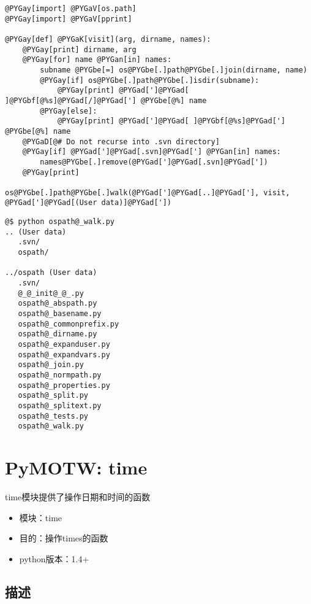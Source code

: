 \documentclass[a4paper,10pt,english]{manual}
\begin{document}
\begin{Verbatim}[commandchars=@\[\]]
@PYGay[import] @PYGaV[os.path]
@PYGay[import] @PYGaV[pprint]

@PYGay[def] @PYGaK[visit](arg, dirname, names):
    @PYGay[print] dirname, arg
    @PYGay[for] name @PYGan[in] names:
        subname @PYGbe[=] os@PYGbe[.]path@PYGbe[.]join(dirname, name)
        @PYGay[if] os@PYGbe[.]path@PYGbe[.]isdir(subname):
            @PYGay[print] @PYGad[']@PYGad[ ]@PYGbf[@%s]@PYGad[/]@PYGad['] @PYGbe[@%] name
        @PYGay[else]:
            @PYGay[print] @PYGad[']@PYGad[ ]@PYGbf[@%s]@PYGad['] @PYGbe[@%] name
    @PYGaD[@# Do not recurse into .svn directory]
    @PYGay[if] @PYGad[']@PYGad[.svn]@PYGad['] @PYGan[in] names:
        names@PYGbe[.]remove(@PYGad[']@PYGad[.svn]@PYGad['])
    @PYGay[print]

os@PYGbe[.]path@PYGbe[.]walk(@PYGad[']@PYGad[..]@PYGad['], visit, @PYGad[']@PYGad[(User data)]@PYGad['])
\end{Verbatim}

\begin{Verbatim}[commandchars=@\[\]]
@$ python ospath@_walk.py
.. (User data)
   .svn/
   ospath/

../ospath (User data)
   .svn/
   @_@_init@_@_.py
   ospath@_abspath.py
   ospath@_basename.py
   ospath@_commonprefix.py
   ospath@_dirname.py
   ospath@_expanduser.py
   ospath@_expandvars.py
   ospath@_join.py
   ospath@_normpath.py
   ospath@_properties.py
   ospath@_split.py
   ospath@_splitext.py
   ospath@_tests.py
   ospath@_walk.py
\end{Verbatim}

\resetcurrentobjects


\chapter{PyMOTW: time}

time模块提供了操作日期和时间的函数
\begin{itemize}
\item {} 
模块：time

\item {} 
目的：操作times的函数

\item {} 
python版本：1.4+

\end{itemize}


\section{描述}
\end{document}
